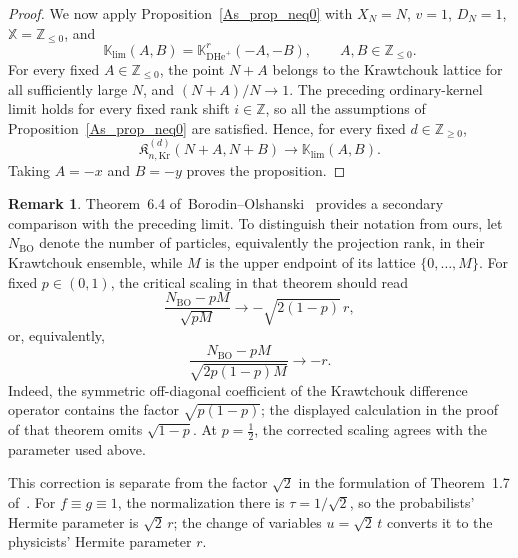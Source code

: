 \documentclass[reqno,11pt]{amsart}
\newcommand{\ZZ}{\mathbb{Z}}
\theoremstyle{plain}
\theoremstyle{definition}
\newtheorem{remark}[thm]{Remark}
\numberwithin{equation}{section}
\begin{document}
\begin{proof}
We now apply Proposition~\ref{As_prop_neq0} with 
$X_N=N$, $v=1$, $D_N=1$, $\mathbb X=\ZZ_{\leq0}$, and
\[
\mathbb K_{\lim}(A,B)
=
\mathbb K_{\mathrm{DHe}^{+}}^r(-A,-B),
\qquad
A,B\in\ZZ_{\leq0}.
\]
For every fixed $A\in\ZZ_{\leq0}$, the point $N+A$ belongs to
the Krawtchouk lattice for all sufficiently large $N$, and
$(N+A)/N\to1$. The preceding ordinary-kernel limit holds for
every fixed rank shift $i\in\ZZ$, so all the assumptions of
Proposition~\ref{As_prop_neq0} are satisfied. Hence, for every
fixed $d\in\ZZ_{\geq0}$,
\[
\mathfrak K^{(d)}_{n,\mathrm{Kr}}(N+A,N+B)
\longrightarrow
\mathbb K_{\lim}(A,B).
\]
Taking $A=-x$ and $B=-y$ proves the proposition.
\end{proof}

\begin{remark}\label{rem:borodin-olshanski}
Theorem~6.4 of~Borodin--Olshanski~\cite{Borodin_2017} provides a secondary comparison with the preceding limit. To distinguish their notation from ours, let $N_{\mathrm{BO}}$ denote the number of particles, equivalently the projection rank, in their Krawtchouk ensemble, while $M$ is the upper endpoint of its lattice $\{0,\ldots,M\}$. For fixed $p\in(0,1)$, the critical scaling in that theorem should read
\[
\frac{N_{\mathrm{BO}}-pM}{\sqrt{pM}}
\longrightarrow
-\sqrt{2(1-p)}\,r,
\]
or, equivalently,
\[
\frac{N_{\mathrm{BO}}-pM}{\sqrt{2p(1-p)M}}
\longrightarrow-r.
\]
Indeed, the symmetric off-diagonal coefficient of the Krawtchouk difference operator contains the factor $\sqrt{p(1-p)}$; the displayed calculation in the proof of that theorem omits $\sqrt{1-p}$. At $p=\frac12$, the corrected scaling agrees with the parameter used above.

This correction is separate from the factor $\sqrt2$ in the formulation of Theorem~1.7 of~\cite{betea2024}. For $f\equiv g\equiv1$, the normalization there is $\tau=1/\sqrt2$, so the probabilists' Hermite parameter is $\sqrt2\,r$; the change of variables $u=\sqrt2\,t$ converts it to the physicists' Hermite parameter $r$.
\end{remark}
\end{document}
